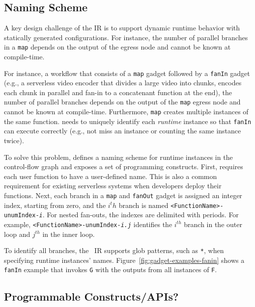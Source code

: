 
\subsection{Naming Scheme}\label{sec:ir:naming}

A key design challenge of the \name{} IR is to support dynamic runtime
behavior with statically generated configurations. For instance, the number of
parallel branches in a \texttt{map} depends on the output of the egress node
and cannot be known at compile-time. 

For instance, a workflow that consists of a \texttt{map} gadget followed by a
\texttt{fanIn} gadget (e.g., a serverless video encoder that divides a large
video into chunks, encodes each chunk in parallel and fan-in to a concatenant
function at the end), the number of parallel branches depends on the output of
the \texttt{map} egress node and cannot be known at compile-time. Furthermore,
\texttt{map} creates multiple instances of the same function. \name{} needs to
uniquely identify each \emph{runtime} instance so that \texttt{fanIn} can
execute correctly (e.g., not miss an instance or counting the same instance
twice).

To solve this problem, \name{} defines a naming scheme for runtime instances
in the control-flow graph and exposes a set of programming constructs. First,
\name{} requires each user function to have a user-defined name. This is also
a common requirement for existing serverless systems when developers deploy
their functions. Next, each branch in a \texttt{map} and \texttt{fanOut}
gadget is assigned an integer index, starting from zero, and the $i^th$ branch
is named \texttt{<FunctionName>-unumIndex-\emph{i}}. For nested fan-outs, the
indexes are delimited with periods. For example,
\texttt{<FunctionName>-unumIndex-\emph{i.j}} identifies the $i^{th}$ branch in
the outer loop and $j^{th}$ in the inner loop.

To identify all branches, the \name{}~IR supports glob patterns, such as
\texttt{*}, when specifying runtime instances' names.
Figure~\ref{fig:gadget-examples-fanin} shows a \texttt{fanIn} example that
invokes \texttt{G} with the outputs from all instances of \texttt{F}.

\subsection{Programmable Constructs/APIs?}

